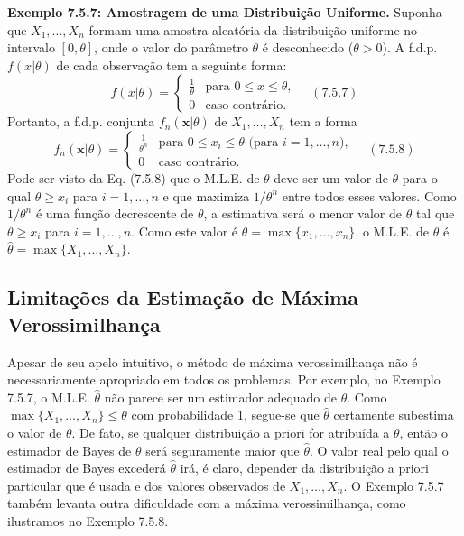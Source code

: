 \vspace{\baselineskip}

\textbf{Exemplo 7.5.7: Amostragem de uma Distribuição Uniforme.} Suponha que $X_1, \dots, X_n$ formam uma amostra aleatória da distribuição uniforme no intervalo $[0, \theta]$, onde o valor do parâmetro $\theta$ é desconhecido ($\theta>0$). A f.d.p. $f(x|\theta)$ de cada observação tem a seguinte forma:
$$f(x|\theta) = \begin{cases} \frac{1}{\theta} & \text{para } 0 \le x \le \theta, \\ 0 & \text{caso contrário}. \end{cases} \quad (7.5.7)$$
Portanto, a f.d.p. conjunta $f_n(\textbf{x}|\theta)$ de $X_1, \dots, X_n$ tem a forma
$$f_n(\textbf{x}|\theta) = \begin{cases} \frac{1}{\theta^n} & \text{para } 0 \le x_i \le \theta \text{ (para } i=1, \dots, n), \\ 0 & \text{caso contrário}. \end{cases} \quad (7.5.8)$$
Pode ser visto da Eq. (7.5.8) que o M.L.E. de $\theta$ deve ser um valor de $\theta$ para o qual $\theta \ge x_i$ para $i=1, \dots, n$ e que maximiza $1/\theta^n$ entre todos esses valores. Como $1/\theta^n$ é uma função decrescente de $\theta$, a estimativa será o menor valor de $\theta$ tal que $\theta \ge x_i$ para $i=1, \dots, n$. Como este valor é $\theta = \max\{x_1, \dots, x_n\}$, o M.L.E. de $\theta$ é $\hat{\theta} = \max\{X_1, \dots, X_n\}$.
\subsection*{Limitações da Estimação de Máxima Verossimilhança}
Apesar de seu apelo intuitivo, o método de máxima verossimilhança não é necessariamente apropriado em todos os problemas. Por exemplo, no Exemplo 7.5.7, o M.L.E. $\hat{\theta}$ não parece ser um estimador adequado de $\theta$. Como $\max\{X_1, \dots, X_n\} \le \theta$ com probabilidade 1, segue-se que $\hat{\theta}$ certamente subestima o valor de $\theta$. De fato, se qualquer distribuição a priori for atribuída a $\theta$, então o estimador de Bayes de $\theta$ será seguramente maior que $\hat{\theta}$. O valor real pelo qual o estimador de Bayes excederá $\hat{\theta}$ irá, é claro, depender da distribuição a priori particular que é usada e dos valores observados de $X_1, \dots, X_n$. O Exemplo 7.5.7 também levanta outra dificuldade com a máxima verossimilhança, como ilustramos no Exemplo 7.5.8.

\vspace{\baselineskip}

